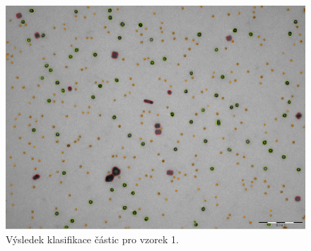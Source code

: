 \documentclass[11pt,twoside,a4paper,table]{book}
\begin{document}
\begin{figure}[h!]
\begin{center}
\includegraphics[width=\textwidth]{figures/multi1_klasifikace.png}
\end{center}
\label{fig:class1}
\caption{Výsledek klasifikace částic pro vzorek 1.}
\end{figure}
\end{document}
